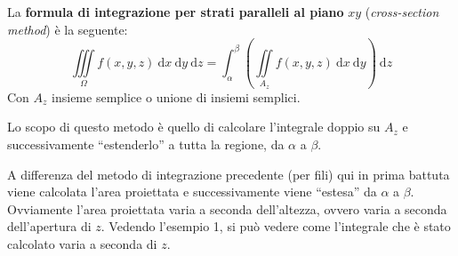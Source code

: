 \documentclass[a4paper]{article}
\newcommand{\dquotes}[1]{``#1''}
\newcommand{\definition}[1]{\textcolor{Red3}{\textbf{#1}}}
\begin{document}
	\begin{boxdef}
		La \definition{formula di integrazione per strati paralleli al piano} $xy$ (\emph{cross-section method}) è la seguente:
		\begin{equation}\label{eq: formula di integrazione per strati}
			\displaystyle\iiint\limits_{\Omega} f\left(x,y,z\right) \:\mathrm{d}x\:\mathrm{d}y\:\mathrm{d}z = \displaystyle\int_{\alpha}^{\beta}\left(\iint\limits_{A_{z}} f\left(x,y,z\right) \:\mathrm{d}x\:\mathrm{d}y\right) \:\mathrm{d}z
		\end{equation}
		Con $A_{z}$ insieme semplice o unione di insiemi semplici.
	\end{boxdef}

	\noindent
	Lo scopo di questo metodo è quello di calcolare l'integrale doppio su $A_{z}$ e successivamente \dquotes{estenderlo} a tutta la regione, da $\alpha$ a $\beta$.
	
	A differenza del metodo di integrazione precedente (per fili) qui in prima battuta viene calcolata l'area proiettata e successivamente viene \dquotes{estesa} da $\alpha$ a $\beta$. Ovviamente l'area proiettata varia a seconda dell'altezza, ovvero varia a seconda dell'apertura di $z$. Vedendo l'esempio 1, si può vedere come l'integrale che è stato calcolato varia a seconda di $z$.\newpage
\end{document}
